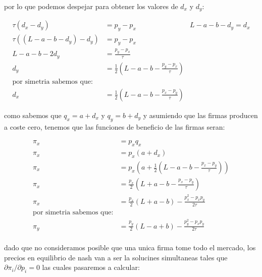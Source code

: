 \documentclass[11pt]{article}
\begin{document}
\begin{flushleft}
\begin{example}
        por lo que podemos despejar para obtener los valores de $d_x$ y $d_y$:

        \begin{align*}
            \tau(d_x-d_y)&=p_y-p_x&L-a-b-d_y=d_x\\
            \tau((L-a-b-d_y)-d_y)&=p_y-p_x\\
            L-a-b-2d_y&=\frac{p_y-p_x}{\tau}\\
            d_y&=\frac{1}{2}\left( L-a-b-\frac{p_y-p_x}{\tau} \right)\\
            \text{por simetria sabemos que:}\\
            d_x&=\frac{1}{2}\left( L-a-b-\frac{p_x-p_y}{\tau} \right)
        \end{align*}

        como sabemos que $q_x=a+d_x$ y $q_y=b+d_y$ y asumiendo que las firmas producen a coste cero, tenemos que las funciones de beneficio de las firmas seran:

        \begin{align*}
            \pi_x &= p_xq_x\\
            \pi_x &= p_x(a+d_x)\\
            \pi_x &= p_x\left(a+\frac{1}{2}\left( L-a-b-\frac{p_x-p_y}{\tau}\right)\right)\\
            \pi_x &= \frac{p_x}{2}\left( L+a-b-\frac{p_x-p_y}{\tau}\right)\\
            \pi_x &= \frac{p_x}{2}\left( L+a-b\right)-\frac{p_x^2-p_xp_y}{2\tau}\\
            \text{por simetria sabemos que:}\\
            \pi_y &= \frac{p_y}{2}\left( L-a+b\right)-\frac{p_y^2-p_xp_y}{2\tau}\\
        \end{align*}

        dado que no consideramos posible que una unica firma tome todo el mercado, los precios en equilibrio de nash van a ser la solucines simultaneas tales que $\partial\pi_i/\partial p_i=0$ las cuales pasaremos a calcular:


\end{example}
\end{flushleft}
\end{document}
